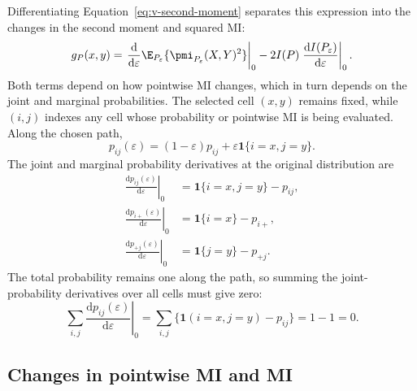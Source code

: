 Differentiating Equation~\eqref{eq:v-second-moment} separates this
expression into the changes in the second moment and squared MI:
\begin{equation}
  g_P(x,y)
  =
  \left.\frac{\mathrm d}{\mathrm d\varepsilon}
  \E_{P_\varepsilon}\{\pmi_{P_\varepsilon}(X,Y)^2\}
  \right|_{0}
  -2I(P)
  \left.\frac{\mathrm d I(P_\varepsilon)}{\mathrm d\varepsilon}
  \right|_{0}.
  \label{eq:g-decomposition}
\end{equation}
Both terms depend on how pointwise MI changes, which in turn depends on
the joint and marginal probabilities. The selected cell \((x,y)\)
remains fixed, while \((i,j)\) indexes any cell whose probability or
pointwise MI is being evaluated. Along the chosen path,
\begin{equation}
  p_{ij}(\varepsilon)
  =(1-\varepsilon)p_{ij}
  +\varepsilon\mathbf 1\{i=x,j=y\}.
\end{equation}
The joint and marginal probability derivatives at the original distribution
are
\begin{align}
  \left.\frac{\mathrm d p_{ij}(\varepsilon)}{\mathrm d\varepsilon}
  \right|_{0}
  &=\mathbf 1\{i=x,j=y\}-p_{ij},
  \label{eq:joint-perturbation-derivative}\\
  \left.\frac{\mathrm d p_{i+}(\varepsilon)}{\mathrm d\varepsilon}
  \right|_{0}
  &=\mathbf 1\{i=x\}-p_{i+},\\
  \left.\frac{\mathrm d p_{+j}(\varepsilon)}{\mathrm d\varepsilon}
  \right|_{0}
  &=\mathbf 1\{j=y\}-p_{+j}.
\end{align}
The total probability remains one along the path, so summing the
joint-probability derivatives over all cells must give zero:
\begin{equation}
  \sum_{i,j}
  \left.\frac{\mathrm d p_{ij}(\varepsilon)}{\mathrm d\varepsilon}
  \right|_{0}
  =
  \sum_{i,j}
  \{\mathbf 1(i=x,j=y)-p_{ij}\}
  =1-1=0.
\end{equation}

\subsection{Changes in pointwise MI and MI}

